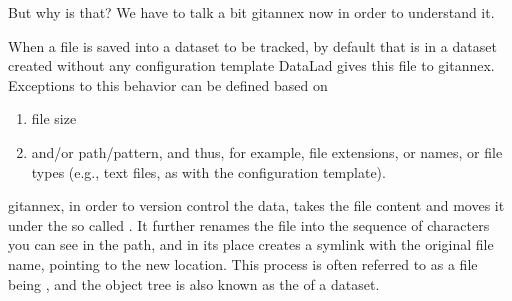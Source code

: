 \sphinxAtStartPar
But why is that? We have to talk a bit git\sphinxhyphen{}annex now in order to understand it.

\sphinxAtStartPar
When a file is saved into a dataset to be tracked,
by default \textendash{} that is in a dataset created without any configuration template \textendash{}
DataLad gives this file to git\sphinxhyphen{}annex. Exceptions to this behavior can be
defined based on
\begin{enumerate}
%
\item {} 
\sphinxAtStartPar
file size

\item {} 
\sphinxAtStartPar
and/or path/pattern, and thus, for example, file extensions,
or names, or file types (e.g., text files, as with the
 configuration template).

\end{enumerate}

\sphinxAtStartPar
git\sphinxhyphen{}annex, in order to version control the data, takes the file content
and moves it under  \textendash{} the so called {\hyperref[\detokenize{glossary:term-object-tree}]{}}.
It further renames the file into the sequence of characters you can see
in the path, and in its place
creates a symlink with the original file name, pointing to the new location.
This process is often referred to as a file being , and the object
tree is also known as the  of a dataset.

